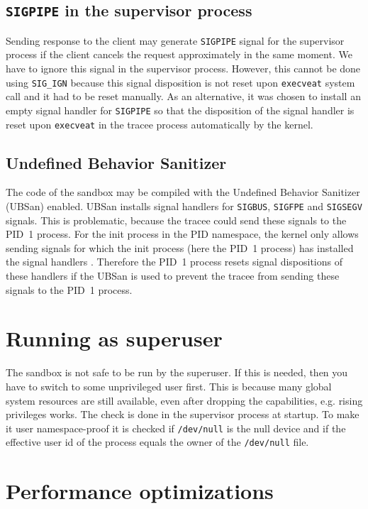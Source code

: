 \documentclass[en]{pracamgr}
\begin{document}
\subsection{\texttt{SIGPIPE} in the supervisor process}

Sending response to the client may generate \texttt{SIGPIPE} signal for the supervisor process if the client cancels the request approximately in the same moment. We have to ignore this signal in the supervisor process. However, this cannot be done using \texttt{SIG\_IGN} because this signal disposition is not reset upon \texttt{execveat} system call and it had to be reset manually. As an alternative, it was chosen to install an empty signal handler for \texttt{SIGPIPE} so that the disposition of the signal handler is reset upon \texttt{execveat} in the tracee process automatically by the kernel.

\subsection{Undefined Behavior Sanitizer}

The code of the sandbox may be compiled with the Undefined Behavior Sanitizer (UBSan) enabled. UBSan installs signal handlers for \texttt{SIGBUS}, \texttt{SIGFPE} and \texttt{SIGSEGV} signals. This is problematic, because the tracee could send these signals to the PID~1 process. For the init process in the PID namespace, the kernel only allows sending signals for which the init process (here the PID~1 process) has installed the signal handlers \cite{man_pid_namespaces}. Therefore the PID~1 process resets signal dispositions of these handlers if the UBSan is used to prevent the tracee from sending these signals to the PID~1 process.

\section{Running as superuser}

The sandbox is not safe to be run by the superuser. If this is needed, then you have to switch to some unprivileged user first. This is because many global system resources are still available, even after dropping the capabilities, e.g. rising privileges works. The check is done in the supervisor process at startup. To make it user namespace-proof it is checked if \texttt{/dev/null} is the null device and if the effective user id of the process equals the owner of the \texttt{/dev/null} file.

\section{Performance optimizations}
\end{document}
